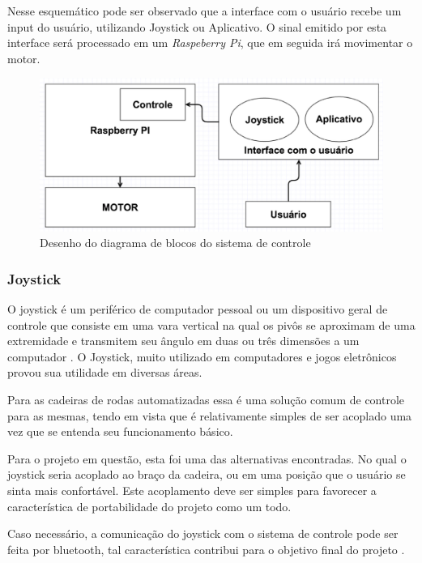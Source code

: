 Nesse esquemático pode ser observado que a interface com o usuário recebe um input do usuário, utilizando Joystick ou Aplicativo. O sinal emitido por esta interface será processado em um \textit{Raspeberry Pi}, que em seguida irá movimentar o motor.

\begin{figure}[!htb]
\centering
  \includegraphics[keepaspectratio=true,scale=0.6]{figuras/controle/diagrama_blocos}
\caption{Desenho do diagrama de blocos do sistema de controle}
\label{fig:diagrama_blocos}
\end{figure}

\subsubsection{Joystick}
O joystick é um periférico de computador pessoal ou um dispositivo geral de controle que consiste em uma vara vertical na qual os pivôs se aproximam de uma extremidade e transmitem seu ângulo em duas ou três dimensões a um computador \cite{livro_creating_games}. O Joystick, muito utilizado em computadores e jogos eletrônicos provou sua utilidade em diversas áreas.

Para as cadeiras de rodas automatizadas essa é uma solução comum de controle para as mesmas, tendo em vista que é relativamente simples de ser acoplado uma vez que se entenda seu funcionamento básico.

Para o projeto em questão, esta foi uma das alternativas encontradas. No qual o joystick seria acoplado ao braço da cadeira, ou em uma posição que o usuário se sinta mais confortável. Este acoplamento deve ser simples para favorecer a característica de portabilidade do projeto como um todo.

Caso necessário, a comunicação do joystick com o sistema de controle pode ser feita por bluetooth, tal característica contribui para o objetivo final do projeto \cite{artigo_joystick_controller}.

